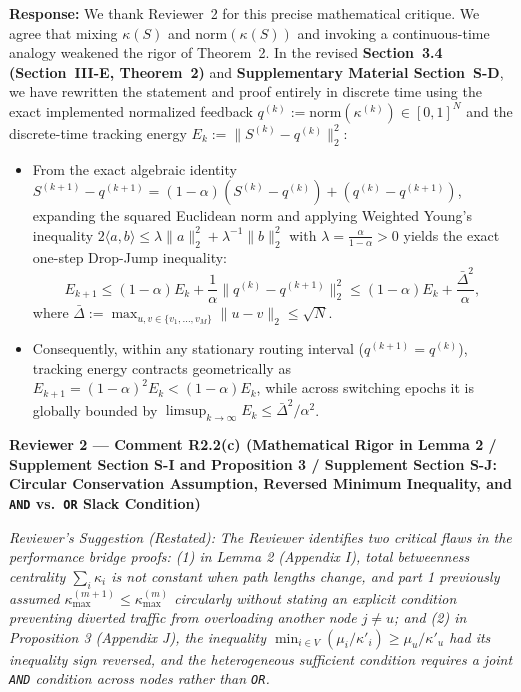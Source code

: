 \documentclass[11pt,a4paper]{article}
\newcommand{\cbox}[2]{%
  \vspace{0.6em}\noindent\textbf{#1}\par\smallskip
  \noindent\textit{Reviewer's Suggestion (Restated):} \textit{#2}\par\smallskip
}
\begin{document}
\noindent\textbf{Response:} We thank Reviewer~2 for this precise mathematical critique. We agree that mixing $\kappa(S)$ and $\mathrm{norm}(\kappa(S))$ and invoking a continuous-time analogy weakened the rigor of Theorem~2. In the revised \textbf{Section~3.4 (Section~III-E, Theorem~2)} and \textbf{Supplementary Material Section~S-D}, we have rewritten the statement and proof entirely in discrete time using the exact implemented normalized feedback $q^{(k)} := \mathrm{norm}(\kappa^{(k)}) \in [0,1]^N$ and the discrete-time tracking energy $E_k := \|S^{(k)} - q^{(k)}\|_2^2$:
\begin{itemize}[leftmargin=1.8em]
    \item From the exact algebraic identity $S^{(k+1)} - q^{(k+1)} = (1-\alpha)(S^{(k)} - q^{(k)}) + (q^{(k)} - q^{(k+1)})$, expanding the squared Euclidean norm and applying Weighted Young's inequality $2\langle a, b\rangle \le \lambda\|a\|_2^2 + \lambda^{-1}\|b\|_2^2$ with $\lambda = \frac{\alpha}{1-\alpha} > 0$ yields the exact one-step Drop-Jump inequality:
    \[
        E_{k+1} \le (1-\alpha)E_k + \frac{1}{\alpha}\big\|q^{(k)} - q^{(k+1)}\big\|_2^2 \le (1-\alpha)E_k + \frac{\bar{\Delta}^2}{\alpha},
    \]
    where $\bar{\Delta} := \max_{u,v \in \{v_1,\dots,v_M\}}\|u-v\|_2 \le \sqrt{N}$.
    \item Consequently, within any stationary routing interval ($q^{(k+1)}=q^{(k)}$), tracking energy contracts geometrically as $E_{k+1} = (1-\alpha)^2 E_k < (1-\alpha)E_k$, while across switching epochs it is globally bounded by $\limsup_{k\to\infty} E_k \le \bar{\Delta}^2/\alpha^2$.
\end{itemize}

\hrulefill

\cbox{Reviewer 2 --- Comment R2.2(c) (Mathematical Rigor in Lemma 2 / Supplement Section S-I and Proposition 3 / Supplement Section S-J: Circular Conservation Assumption, Reversed Minimum Inequality, and \texttt{AND} vs.\ \texttt{OR} Slack Condition)}{The Reviewer identifies two critical flaws in the performance bridge proofs: (1) in Lemma 2 (Appendix I), total betweenness centrality $\sum_i \kappa_i$ is not constant when path lengths change, and part 1 previously assumed $\kappa_{\max}^{(m+1)} \le \kappa_{\max}^{(m)}$ circularly without stating an explicit condition preventing diverted traffic from overloading another node $j \neq u$; and (2) in Proposition 3 (Appendix J), the inequality $\min_{i\in V}(\mu_i/\kappa'_i) \ge \mu_u/\kappa'_u$ had its inequality sign reversed, and the heterogeneous sufficient condition requires a joint \texttt{AND} condition across nodes rather than \texttt{OR}.}
\end{document}
